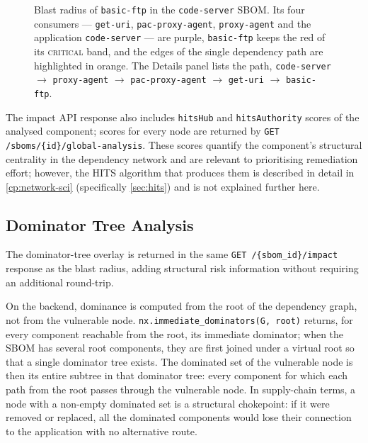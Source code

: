 \begin{figure}[!htpb]
    \centering
    \caption[Blast-radius overlay]{Blast radius of \texttt{basic-ftp} in the \texttt{code-server} SBOM. Its four consumers --- \texttt{get-uri}, \texttt{pac-proxy-agent}, \texttt{proxy-agent} and the application \texttt{code-server} --- are purple, \texttt{basic-ftp} keeps the red of its \textsc{critical} band, and the edges of the single dependency path are highlighted in orange. The Details panel lists the path, \texttt{code-server} \(\to\) \texttt{proxy-agent} \(\to\) \texttt{pac-proxy-agent} \(\to\) \texttt{get-uri} \(\to\) \texttt{basic-ftp}.}
    \label{fig:blast-radius}
\end{figure}

The impact API response also includes \texttt{hitsHub} and \texttt{hitsAuthority} scores of the analysed component; scores for every node are returned by \texttt{GET /sboms/\{id\}/global-analysis}. These scores quantify the component's structural centrality in the dependency network and are relevant to prioritising remediation effort; however, the HITS algorithm that produces them is described in detail in \autoref{cp:network-sci} (specifically \autoref{sec:hits}) and is not explained further here.


\subsection{Dominator Tree Analysis}
\label{sec:dominator-tree}

The dominator-tree overlay is returned in the same \texttt{GET /\{sbom\_id\}/impact} response as the blast radius, adding structural risk information without requiring an additional round-trip.

On the backend, dominance is computed from the root of the dependency graph, not from the vulnerable node. \texttt{nx.immediate\_dominators(G, root)} returns, for every component reachable from the root, its immediate dominator; when the SBOM has several root components, they are first joined under a virtual root so that a single dominator tree exists. The dominated set of the vulnerable node is then its entire subtree in that dominator tree: every component for which each path from the root passes through the vulnerable node. In supply-chain terms, a node with a non-empty dominated set is a structural chokepoint: if it were removed or replaced, all the dominated components would lose their connection to the application with no alternative route.

